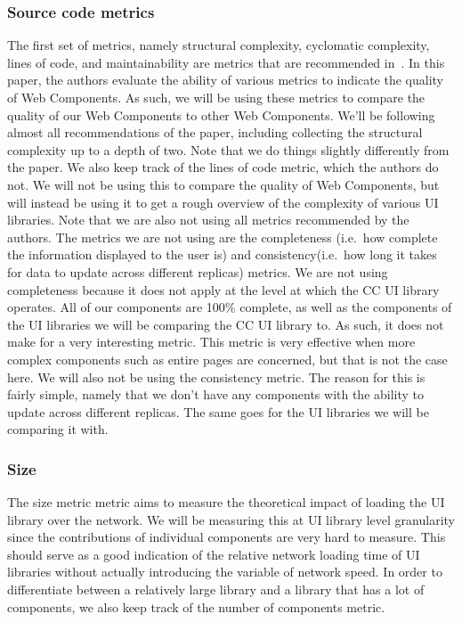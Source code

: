 \subsubsection{Source code metrics}
The first set of metrics, namely structural complexity, cyclomatic complexity, lines of code, and maintainability are metrics that are recommended in~\cite{martinez-ortiz2016quality}. In this paper, the authors evaluate the ability of various metrics to indicate the quality of Web Components. As such, we will be using these metrics to compare the quality of our Web Components to other Web Components. We'll be following almost all recommendations of the paper, including collecting the structural complexity up to a depth of two. Note that we do things slightly differently from the paper. We also keep track of the lines of code metric, which the authors do not. We will not be using this to compare the quality of Web Components, but will instead be using it to get a rough overview of the complexity of various UI libraries. Note that we are also not using all metrics recommended by the authors. The metrics we are not using are the completeness (i.e.~how complete the information displayed to the user is) and consistency(i.e.~how long it takes for data to update across different replicas) metrics. We are not using completeness because it does not apply at the level at which the CC UI library operates. All of our components are 100\% complete, as well as the components of the UI libraries we will be comparing the CC UI library to. As such, it does not make for a very interesting metric. This metric is very effective when more complex components such as entire pages are concerned, but that is not the case here. We will also not be using the consistency metric. The reason for this is fairly simple, namely that we don't have any components with the ability to update across different replicas. The same goes for the UI libraries we will be comparing it with.

\subsubsection{Size}
The size metric metric aims to measure the theoretical impact of loading the UI library over the network. We will be measuring this at UI library level granularity since the contributions of individual components are very hard to measure. This should serve as a good indication of the relative network loading time of UI libraries without actually introducing the variable of network speed. In order to differentiate between a relatively large library and a library that has a lot of components, we also keep track of the number of components metric.

